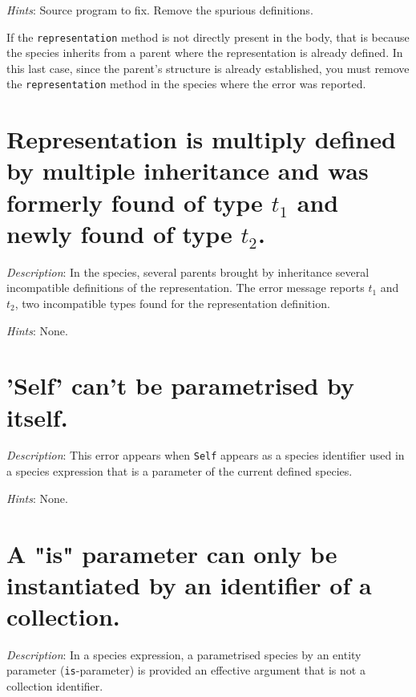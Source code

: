 {\em Hints}: Source program to fix. Remove the spurious definitions.

If the {\tt representation} method is not directly present in the
body, that is because the species inherits from a parent where the
representation is already defined. In this last case, since the parent's
structure is already established, you must remove the {\tt representation} method
in the species where the error was reported.



\section*{Representation is multiply defined by multiple
  inheritance and was formerly found of type $t_1$ and newly found of
  type $t_2$.}

{\em Description}: In the species, several parents brought by
inheritance several incompatible definitions of the representation. The error message reports $t_1$ and $t_2$, two incompatible
types found for the representation definition.

{\em Hints}: None.



\section*{'Self' can't be parametrised by itself.}

{\em Description}: This error appears when {\tt Self} appears as a
species identifier used in a species expression that is a parameter of
the current defined species.



{\em Hints}: None.



\section*{A  "is"  parameter can only be instantiated by an identifier of a collection.}

{\em Description}: In a species expression, a parametrised species by
an entity parameter ({\tt is}-parameter) is provided an effective
argument that is not a collection identifier.

